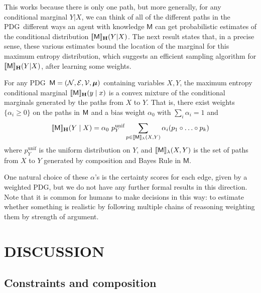 \documentclass{article}
\newcommand\MaxEnt{_{\mathbf H}}
\newcommand{\sfM}{\mathsf M}
\newcommand{\MN}{PDG}
\numberwithin{equation}{section}
\begin{document}
	This works because there is only one path, but more generally, for any conditional marginal $Y|X$, we can think of all of the different paths in the \MN\ different ways an agent with knowledge $\sfM$ can get probabilistic estimates of the conditional distribution $\bbr{\sfM}\MaxEnt(Y | X)$. The next result states that, in a precise sense, these various estimates bound the location of the marginal for this maximum entropy distribution, which suggests an efficient sampling algorithm for $\bbr{\sfM}\MaxEnt(Y | X)$, after learning some weights.
	
	\begin{conj}\label{thm:maxent-hull}
		For any \MN\ $\sfM = \mnvars[]$ containing variables $X, Y$, the maximum entropy conditional marginal $\bbr{\sfM}\MaxEnt(y \mid x)$ is a convex mixture of the conditional marginals generated by the paths from $X$ to $Y$.  That is, there exist weights $\{\alpha_i \geq 0\}$ on the paths in $\sf M$ and a bias weight $\alpha_0$ with $\sum_i {\alpha_i} = 1$ and
		\[ \bbr{\sfM}\MaxEnt(Y \mid X) = \alpha_0 \  p^{\text{unif}}_Y \sum_{p \in \bbr{\sfM}_\lambda(X, Y)} \alpha_i (p_1 \circ \ldots \circ p_k) \]
		where $p^{\text{unif}}_Y$ is the uniform distribution on $Y$, and $\bbr{\sfM}_\lambda(X,Y)$ is the set of paths from $X$ to $Y$ generated by composition and Bayes Rule in $\sfM$. 
	\end{conj}

	One natural choice of these $\alpha$'s is the certainty scores for each edge, given by a weighted \MN, but we do not have any further formal results in this direction.
	Note that it is common for humans to make decisions in this way: to estimate whether something is realistic by following multiple chains of reasoning weighting them by strength of argument.
	
	





	\section{DISCUSSION}
	
	\subsection{Constraints and composition}
	
\end{document}
